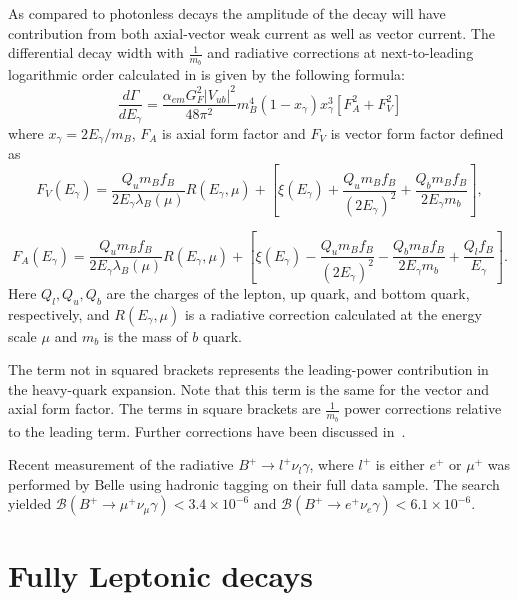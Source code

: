 As compared to photonless decays the amplitude of the decay will have contribution from both axial-vector weak current as well as vector current.
The differential decay width with $\frac{1}{m_{b}}$ and radiative corrections
at next-to-leading logarithmic order calculated in\cite{Beneke:2011nf} is given by the following formula:
\begin{equation}
\frac{d\Gamma}{dE_{\gamma}} = \frac{\alpha_{em}G^{2}_{F}|V_{ub}|^{2}}{48 \pi^{2}}m_{B}^{4}(1 - x_{\gamma})x_{\gamma}^{3}[F_A^{2} + F_V^{2}]
\end{equation}
 where $x_{\gamma} = 2E_{\gamma}/m_{B}$, $F_A$ is axial form factor and $F_V$  is vector form factor defined as
\begin{equation}
F_{V}(E_{\gamma}) = \frac{Q_{u}m_{B}f_{B}}{2E_{\gamma}\lambda_{B}(\mu)} R(E_{\gamma}, \mu) + [\xi(E_\gamma) +  \frac{Q_{u}m_{B}f_{B}}{(2E_{\gamma})^{2}} + \frac{Q_{b}m_{B}f_{B}}{2E_{\gamma}m_{b}}],
\end{equation}

\begin{equation}
F_{A}(E_{\gamma}) = \frac{Q_{u}m_{B}f_{B}}{2E_{\gamma}\lambda_{B}(\mu)} R(E_{\gamma}, \mu) + [\xi(E_\gamma) -  \frac{Q_{u}m_{B}f_{B}}{(2E_{\gamma})^{2}} - \frac{Q_{b}m_{B}f_{B}}{2E_{\gamma}m_{b}} + \frac{Q_{l}f_{B}}{E_{\gamma}}].
\end{equation}
Here $Q_{l},Q_{u},Q_{b}$ are the charges of the lepton, up quark, and
bottom quark, respectively, and $R(E_{\gamma}, \mu)$ is a radiative correction
calculated at the energy scale $\mu$ %
and $m_{b}$ is the mass of $b$ quark.

The term not in squared brackets represents the leading-power contribution in the heavy-quark expansion. Note that this term
is the same for the vector and axial form factor. The terms in square brackets are $\frac{1}{m_{b}}$ power corrections relative to the leading term. Further corrections have been discussed in~\cite{Wang:2016beq}.



Recent measurement of the radiative $B^{+} \rightarrow l^{+} \nu_{l} \gamma$, where $l^{+}$ is either $e^{+}$ or $\mu^{+}$ was performed by Belle using hadronic tagging on their full data sample\cite{Heller:2015vvm}. The search yielded $\mathcal{B}(B^{+}\rightarrow \mu^{+} \nu_\mu \gamma) < 3.4\times 10^{-6}$ and $\mathcal{B}(B^{+}\rightarrow e^{+} \nu_e \gamma) < 6.1\times 10^{-6}$.



\section{Fully Leptonic  decays}
\label{mydecay}


